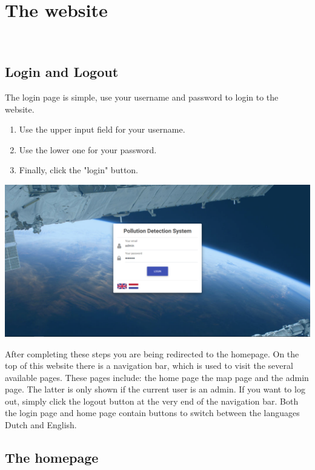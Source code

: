 \documentclass[a4paper]{article}
\begin{document}
\pagebreak

\section{The website}
~\newline

\subsection{Login and Logout}
The login page is simple, use your username and password to login to the website.

\begin{enumerate}[wide, labelwidth=!, labelindent=0pt]
\item Use the upper input field for your username.
\item Use the lower one for your password.
\item Finally, click the "login" button.
\end{enumerate}

\noindent
\includegraphics[width=\textwidth]{login}

\noindent
After completing these steps you are being redirected to the homepage.
\newline
On the top of this website there is a navigation bar, which is used to visit the several available pages. These pages include: the home page the map page and the admin page. The latter is only shown if the current user is an admin.
\newline
If you want to log out, simply click the logout button at the very end of the navigation bar.
\newline
Both the login page and home page contain buttons to switch between the languages Dutch and English.

\pagebreak

\subsection{The homepage}
\lipsum[1-2]
% 
% 
\end{document}
